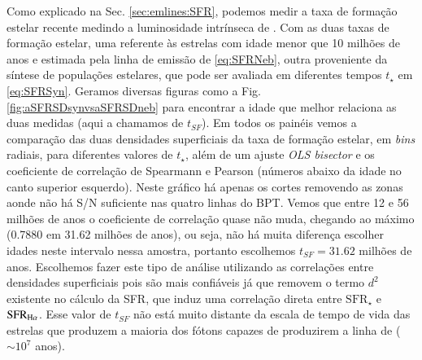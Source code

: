 Como explicado na Sec. \ref{sec:emlines:SFR}, podemos medir a taxa de formação estelar recente
medindo a luminosidade intrínseca de \Halpha. Com as duas taxas de formação estelar, uma referente
às estrelas com idade menor que 10 milhões de anos e estimada pela linha de emissão de \Halpha
\eqref{eq:SFRNeb}, outra proveniente da síntese de populações estelares, que pode ser avaliada em
diferentes tempos $t_\star$ em \eqref{eq:SFRSyn}. Geramos diversas figuras como a Fig.
\ref{fig:aSFRSDsynvsaSFRSDneb} para encontrar a idade que melhor relaciona as duas medidas (aqui a
chamamos de $t_{SF}$). Em todos os painéis vemos a comparação das duas densidades superficiais da
taxa de formação estelar, em {\em bins} radiais, para diferentes valores de $t_\star$, além de um
ajuste {\em OLS bisector} e os coeficiente de correlação de Spearmann e Pearson (números abaixo da
idade no canto superior esquerdo). Neste gráfico há apenas os cortes removendo as zonas aonde não há
S/N suficiente nas quatro linhas do BPT. Vemos que entre 12 e 56 milhões de anos o coeficiente de
correlação quase não muda, chegando ao máximo (0.7880 em 31.62 milhões de anos), ou seja, não há
muita diferença escolher idades neste intervalo nessa amostra, portanto escolhemos $t_{SF} = 31.62$
milhões de anos. Escolhemos fazer este tipo de análise utilizando as correlações entre densidades
superficiais pois são mais confiáveis já que removem o termo $d^2$ existente no cálculo da SFR, que
induz uma correlação direta entre $\mathrm{SFR}_\star$ e $\mathrm{SFR}_{\Halpha}$. Esse valor
de $t_{SF}$ não está muito distante da escala de tempo de vida das estrelas que produzem a
maioria dos fótons capazes de produzirem a linha de \Halpha ($\sim10^7$ anos).

